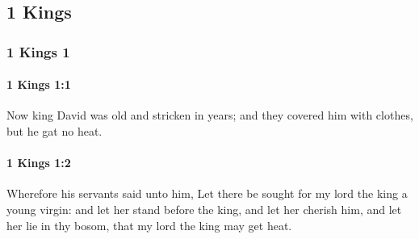 \subsection{1 Kings}
	\label{1KINGS}

	\subsubsection{1 Kings 1} %
		\label{1KINGS-1}

		\paragraph{1 Kings 1:1} %
			\label{1KINGS-1-1}

			Now king David was old and stricken in years; and they covered him with clothes, but he gat no heat.


		\paragraph{1 Kings 1:2} %
			\label{1KINGS-1-2}

			Wherefore his servants said unto him, Let there be sought for my lord the king a young virgin: and let her stand before the king, and let her cherish him, and let her lie in thy bosom, that my lord the king may get heat.

